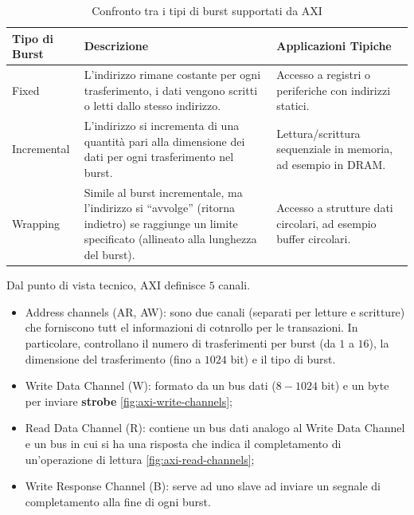 \documentclass{article}
\begin{document}
\begin{table}[h]
\centering
\begin{tabular}{|p{3cm}|p{7cm}|p{5cm}|}
\hline
\textbf{Tipo di Burst} & \textbf{Descrizione}                                                                                                                                 & \textbf{Applicazioni Tipiche}                                 \\ \hline
Fixed                  & L'indirizzo rimane costante per ogni trasferimento, i dati vengono scritti o letti dallo stesso indirizzo.                                           & Accesso a registri o periferiche con indirizzi statici.       \\ \hline
Incremental            & L'indirizzo si incrementa di una quantità pari alla dimensione dei dati per ogni trasferimento nel burst.                                           & Lettura/scrittura sequenziale in memoria, ad esempio in DRAM. \\ \hline
Wrapping               & Simile al burst incrementale, ma l'indirizzo si “avvolge” (ritorna indietro) se raggiunge un limite specificato (allineato alla lunghezza del burst). & Accesso a strutture dati circolari, ad esempio buffer circolari. \\ \hline
\end{tabular}
\caption{Confronto tra i tipi di burst supportati da AXI}
\label{tab:burst_types}
\end{table}


Dal punto di vista tecnico, AXI definisce $5$ canali. 
\begin{itemize}
  \item Address channels (AR, AW): sono due canali (separati per letture  e scritture) che forniscono tutt el informazioni di cotnrollo per le transazioni. In particolare, controllano il numero di trasferimenti per burst (da $1$ a $16$), la dimensione del trasferimento (fino a $1024$ bit) e il tipo di burst.
  \item Write Data Channel (W): formato da un bus dati ($8-1024$ bit) e un byte per inviare \textbf{strobe} \cref{fig:axi-write-channels};
  \item Read Data Channel (R): contiene un bus dati analogo al Write Data Channel e un bus in cui si ha una risposta che indica il completamento di un'operazione di lettura \cref{fig:axi-read-channels};
  \item Write Response Channel (B): serve ad uno slave ad inviare un segnale di completamento alla fine di ogni burst.
\end{itemize}
\end{document}
